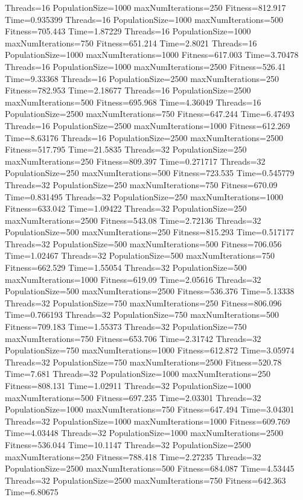 \documentclass[10pt,letterpaper]{article}
\begin{document}
Threads=16 PopulationSize=1000 maxNumIterations=250 Fitness=812.917 Time=0.935399
Threads=16 PopulationSize=1000 maxNumIterations=500 Fitness=705.443 Time=1.87229
Threads=16 PopulationSize=1000 maxNumIterations=750 Fitness=651.214 Time=2.8021
Threads=16 PopulationSize=1000 maxNumIterations=1000 Fitness=617.003 Time=3.70478
Threads=16 PopulationSize=1000 maxNumIterations=2500 Fitness=526.41 Time=9.33368
Threads=16 PopulationSize=2500 maxNumIterations=250 Fitness=782.953 Time=2.18677
Threads=16 PopulationSize=2500 maxNumIterations=500 Fitness=695.968 Time=4.36049
Threads=16 PopulationSize=2500 maxNumIterations=750 Fitness=647.244 Time=6.47493
Threads=16 PopulationSize=2500 maxNumIterations=1000 Fitness=612.269 Time=8.63176
Threads=16 PopulationSize=2500 maxNumIterations=2500 Fitness=517.795 Time=21.5835
Threads=32 PopulationSize=250 maxNumIterations=250 Fitness=809.397 Time=0.271717
Threads=32 PopulationSize=250 maxNumIterations=500 Fitness=723.535 Time=0.545779
Threads=32 PopulationSize=250 maxNumIterations=750 Fitness=670.09 Time=0.831495
Threads=32 PopulationSize=250 maxNumIterations=1000 Fitness=633.042 Time=1.09422
Threads=32 PopulationSize=250 maxNumIterations=2500 Fitness=543.08 Time=2.72136
Threads=32 PopulationSize=500 maxNumIterations=250 Fitness=815.293 Time=0.517177
Threads=32 PopulationSize=500 maxNumIterations=500 Fitness=706.056 Time=1.02467
Threads=32 PopulationSize=500 maxNumIterations=750 Fitness=662.529 Time=1.55054
Threads=32 PopulationSize=500 maxNumIterations=1000 Fitness=619.09 Time=2.05616
Threads=32 PopulationSize=500 maxNumIterations=2500 Fitness=536.376 Time=5.13338
Threads=32 PopulationSize=750 maxNumIterations=250 Fitness=806.096 Time=0.766193
Threads=32 PopulationSize=750 maxNumIterations=500 Fitness=709.183 Time=1.55373
Threads=32 PopulationSize=750 maxNumIterations=750 Fitness=653.706 Time=2.31742
Threads=32 PopulationSize=750 maxNumIterations=1000 Fitness=612.872 Time=3.05974
Threads=32 PopulationSize=750 maxNumIterations=2500 Fitness=520.78 Time=7.681
Threads=32 PopulationSize=1000 maxNumIterations=250 Fitness=808.131 Time=1.02911
Threads=32 PopulationSize=1000 maxNumIterations=500 Fitness=697.235 Time=2.03301
Threads=32 PopulationSize=1000 maxNumIterations=750 Fitness=647.494 Time=3.04301
Threads=32 PopulationSize=1000 maxNumIterations=1000 Fitness=609.769 Time=4.03448
Threads=32 PopulationSize=1000 maxNumIterations=2500 Fitness=536.044 Time=10.1147
Threads=32 PopulationSize=2500 maxNumIterations=250 Fitness=788.418 Time=2.27235
Threads=32 PopulationSize=2500 maxNumIterations=500 Fitness=684.087 Time=4.53445
Threads=32 PopulationSize=2500 maxNumIterations=750 Fitness=642.363 Time=6.80675
\end{document}
